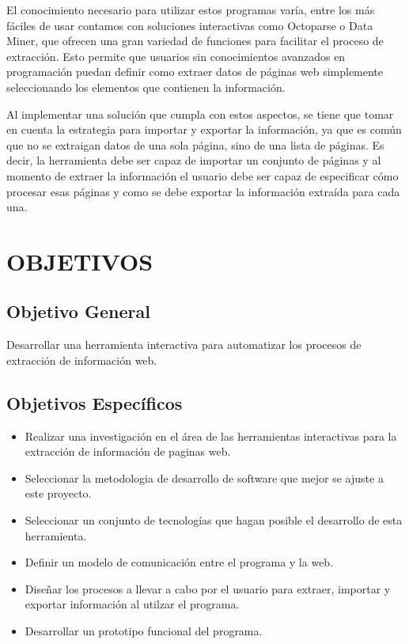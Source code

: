 \documentclass[12pt]{report}
\begin{document}
El conocimiento necesario para utilizar estos programas varía, entre los más fáciles de usar contamos con soluciones interactivas como Octoparse o Data Miner, que ofrecen una gran variedad de funciones para facilitar el proceso de extracción. Esto permite que usuarios sin conocimientos avanzados en programación puedan definir como extraer datos de páginas web simplemente seleccionando los elementos que contienen la información.

Al implementar una solución que cumpla con estos aspectos, se tiene que tomar en cuenta la estrategia para importar y exportar la información, ya que es común que no se extraigan datos de una sola página, sino de una lista de páginas. Es decir, la herramienta debe ser capaz de importar un conjunto de páginas y al momento de extraer la información el usuario debe ser capaz de especificar cómo procesar esas páginas y como se debe exportar la información extraída para cada una.

\break


\section[Objetivos]{OBJETIVOS}

\subsection{Objetivo General}
Desarrollar una herramienta interactiva para automatizar los procesos de extracción de información web.

\subsection{Objetivos Específicos}
\begin{itemize}
\setlength\itemsep{0pt}

\item Realizar una investigación en el área de las herramientas interactivas para la extracción de información de paginas web.
\item Seleccionar la metodologia de desarrollo de software que mejor se ajuste a este proyecto.
\item Seleccionar un conjunto de tecnologías que hagan posible el desarrollo de esta herramienta.
\item Definir un modelo de comunicación entre el programa y la web.
\item Diseñar los procesos a llevar a cabo por el usuario para extraer, importar y exportar información al utilzar el programa.
\item Desarrollar un prototipo funcional del programa.

\end{itemize}
\end{document}
